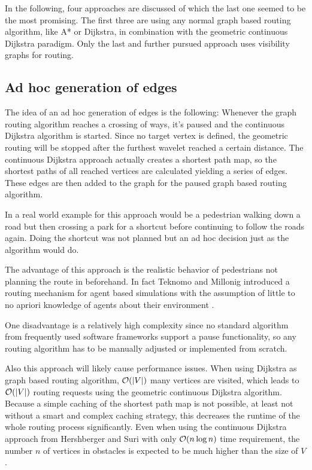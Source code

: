 	In the following, four approaches are discussed of which the last one seemed to be the most promising.
	The first three are using any normal graph based routing algorithm, like A* or Dijkstra, in combination with the geometric continuous Dijkstra paradigm.
	Only the last and further pursued approach uses visibility graphs for routing.
	
	\subsection{Ad hoc generation of edges}
	
		The idea of an ad hoc generation of edges is the following:
		Whenever the graph routing algorithm reaches a crossing of ways, it's paused and the continuous Dijkstra algorithm is started.
		Since no target vertex is defined, the geometric routing will be stopped after the furthest wavelet reached a certain distance.
		The continuous Dijkstra approach actually creates a shortest path map, so the shortest paths of all reached vertices are calculated yielding a series of edges.
		These edges are then added to the graph for the paused graph based routing algorithm.
		
		In a real world example for this approach would be a pedestrian walking down a road but then crossing a park for a shortcut before continuing to follow the roads again.
		Doing the shortcut was not planned but an ad hoc decision just as the algorithm would do.
		
		The advantage of this approach is the realistic behavior of pedestrians not planning the route in beforehand.
		In fact Teknomo and Millonig introduced a routing mechanism for agent based simulations with the assumption of little to no apriori knowledge of agents about their environment \cite{teknomo-millonig-routing}.
		
		One disadvantage is a relatively high complexity since no standard algorithm from frequently used software frameworks support a pause functionality, so any routing algorithm has to be manually adjusted or implemented from scratch.
		
		Also this approach will likely cause performance issues.
		When using Dijkstra as graph based routing algorithm, $\mathcal{O}(|V|)$ many vertices are visited, which leads to $\mathcal{O}(|V|)$ routing requests using the geometric continuous Dijkstra algorithm.
		Because a simple caching of the shortest path map is not possible, at least not without a smart and complex caching strategy, this decreases the runtime of the whole routing process significantly.
		Even when using the continuous Dijkstra approach from Hershberger and Suri \cite{hershberger-suri} with only $\mathcal{O}(n \log n)$ time requirement, the number $n$ of vertices in obstacles is expected to be much higher than the size of $V$.
		
